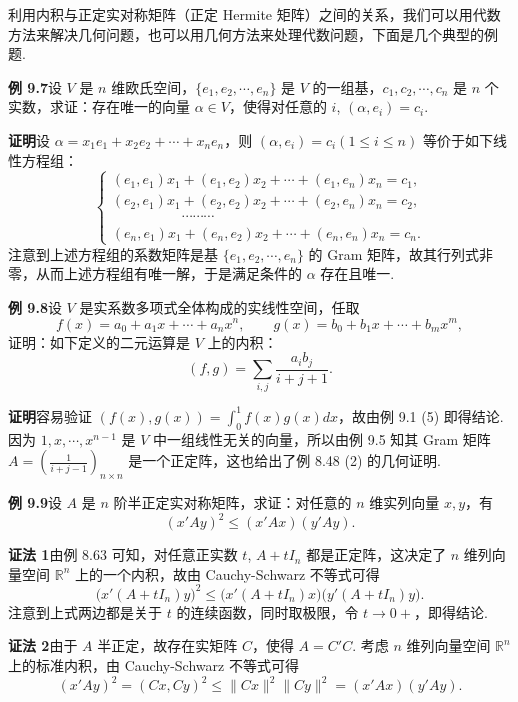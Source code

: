 \documentclass[UTF8, 12pt, fontset=fandol, oneside]{ctexart}
\begin{document}
利用内积与正定实对称矩阵（正定 Hermite 矩阵）之间的关系，我们可以用代数方法来解决几何问题，也可以用几何方法来处理代数问题，下面是几个典型的例题.

\noindent\textbf{例 9.7}\quad 设 $V$ 是 $n$ 维欧氏空间，$\{e_1,e_2,\cdots,e_n\}$ 是 $V$ 的一组基，$c_1,c_2,\cdots,c_n$ 是 $n$ 个实数，求证：存在唯一的向量 $\alpha\in V$，使得对任意的 $i$, $(\alpha,e_i)=c_i$.

\noindent\textbf{证明}\quad 设 $\alpha=x_1e_1+x_2e_2+\cdots+x_ne_n$，则 $(\alpha,e_i)=c_i(1\le i\le n)$ 等价于如下线性方程组：
\[
\left\{
\begin{array}{l}
(e_1,e_1)x_1+(e_1,e_2)x_2+\cdots+(e_1,e_n)x_n=c_1,\\
(e_2,e_1)x_1+(e_2,e_2)x_2+\cdots+(e_2,e_n)x_n=c_2,\\
\hspace{5em}\cdots\cdots\cdots\\
(e_n,e_1)x_1+(e_n,e_2)x_2+\cdots+(e_n,e_n)x_n=c_n.
\end{array}
\right.
\]
注意到上述方程组的系数矩阵是基 $\{e_1,e_2,\cdots,e_n\}$ 的 Gram 矩阵，故其行列式非零，从而上述方程组有唯一解，于是满足条件的 $\alpha$ 存在且唯一.

\noindent\textbf{例 9.8}\quad 设 $V$ 是实系数多项式全体构成的实线性空间，任取
\[
f(x)=a_0+a_1x+\cdots+a_nx^n,\qquad
g(x)=b_0+b_1x+\cdots+b_mx^m,
\]
证明：如下定义的二元运算是 $V$ 上的内积：
\[
(f,g)=\sum_{i,j}\frac{a_ib_j}{i+j+1}.
\]

\noindent\textbf{证明}\quad 容易验证 $(f(x),g(x))=\int_0^1 f(x)g(x)dx$，故由例 9.1 (5) 即得结论. 因为 $1,x,\cdots,x^{n-1}$ 是 $V$ 中一组线性无关的向量，所以由例 9.5 知其 Gram 矩阵 $A=\left(\frac1{i+j-1}\right)_{n\times n}$ 是一个正定阵，这也给出了例 8.48 (2) 的几何证明.

\noindent\textbf{例 9.9}\quad 设 $A$ 是 $n$ 阶半正定实对称矩阵，求证：对任意的 $n$ 维实列向量 $x,y$，有
\[
(x'Ay)^2\le (x'Ax)(y'Ay).
\]

\noindent\textbf{证法 1}\quad 由例 8.63 可知，对任意正实数 $t$, $A+tI_n$ 都是正定阵，这决定了 $n$ 维列向量空间 $\mathbb{R}^n$ 上的一个内积，故由 Cauchy-Schwarz 不等式可得
\[
\bigl(x'(A+tI_n)y\bigr)^2\le \bigl(x'(A+tI_n)x\bigr)\bigl(y'(A+tI_n)y\bigr).
\]
注意到上式两边都是关于 $t$ 的连续函数，同时取极限，令 $t\to 0+$，即得结论.

\noindent\textbf{证法 2}\quad 由于 $A$ 半正定，故存在实矩阵 $C$，使得 $A=C'C$. 考虑 $n$ 维列向量空间 $\mathbb{R}^n$ 上的标准内积，由 Cauchy-Schwarz 不等式可得
\[
(x'Ay)^2=(Cx,Cy)^2\le \|Cx\|^2\|Cy\|^2=(x'Ax)(y'Ay).
\]
\end{document}
